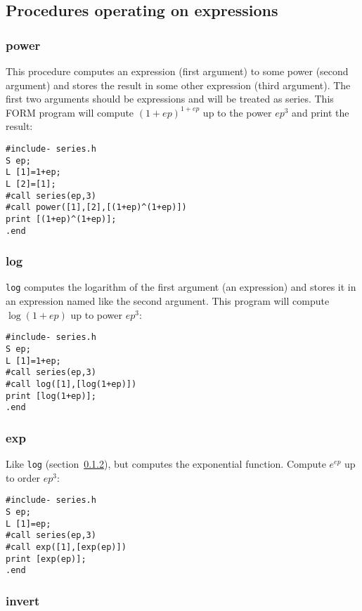 \documentclass{article}
\begin{document}
\subsection{Procedures operating on expressions}
\label{sec:proc_expr}

\subsubsection{power}
\label{sec:pow}

This procedure computes an expression (first argument) to some power
(second argument) and stores the result in some other expression (third
argument). The first two arguments should be expressions and will be
treated as series. This FORM program will compute $(1+ep)^{1+ep}$ up to
the power $ep^3$ and print the result:
\begin{verbatim}
#include- series.h
S ep;
L [1]=1+ep;
L [2]=[1];
#call series(ep,3)
#call power([1],[2],[(1+ep)^(1+ep)])
print [(1+ep)^(1+ep)];
.end
\end{verbatim}


\subsubsection{log}
\label{sec:log}

{\tt log} computes the logarithm of the first argument (an
expression) and stores it in an expression named like the second
argument. This program will compute $\log (1+ep)$ up to power $ep^3$:
\begin{verbatim}
#include- series.h
S ep;
L [1]=1+ep;
#call series(ep,3)
#call log([1],[log(1+ep)])
print [log(1+ep)];
.end
\end{verbatim}



\subsubsection{exp}
\label{sec:exp}

Like {\tt log} (section~\ref{sec:log}), but computes the
exponential function. Compute $e^{ep}$ up to order $ep^3$:
\begin{verbatim}
#include- series.h
S ep;
L [1]=ep;
#call series(ep,3)
#call exp([1],[exp(ep)])
print [exp(ep)];
.end
\end{verbatim}


\subsubsection{invert}
\label{sec:invert}
\end{document}
